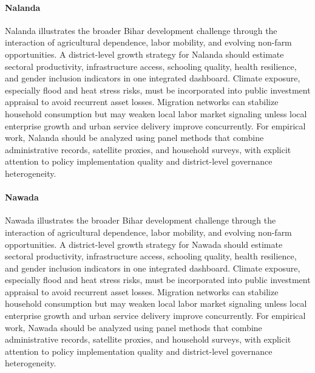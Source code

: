 \documentclass[preprint,12pt]{elsarticle}
\begin{document}
\paragraph{Nalanda} Nalanda illustrates the broader Bihar development challenge through the interaction of agricultural dependence, labor mobility, and evolving non-farm opportunities. A district-level growth strategy for Nalanda should estimate sectoral productivity, infrastructure access, schooling quality, health resilience, and gender inclusion indicators in one integrated dashboard. Climate exposure, especially flood and heat stress risks, must be incorporated into public investment appraisal to avoid recurrent asset losses. Migration networks can stabilize household consumption but may weaken local labor market signaling unless local enterprise growth and urban service delivery improve concurrently. For empirical work, Nalanda should be analyzed using panel methods that combine administrative records, satellite proxies, and household surveys, with explicit attention to policy implementation quality and district-level governance heterogeneity.

\paragraph{Nawada} Nawada illustrates the broader Bihar development challenge through the interaction of agricultural dependence, labor mobility, and evolving non-farm opportunities. A district-level growth strategy for Nawada should estimate sectoral productivity, infrastructure access, schooling quality, health resilience, and gender inclusion indicators in one integrated dashboard. Climate exposure, especially flood and heat stress risks, must be incorporated into public investment appraisal to avoid recurrent asset losses. Migration networks can stabilize household consumption but may weaken local labor market signaling unless local enterprise growth and urban service delivery improve concurrently. For empirical work, Nawada should be analyzed using panel methods that combine administrative records, satellite proxies, and household surveys, with explicit attention to policy implementation quality and district-level governance heterogeneity.
\end{document}
